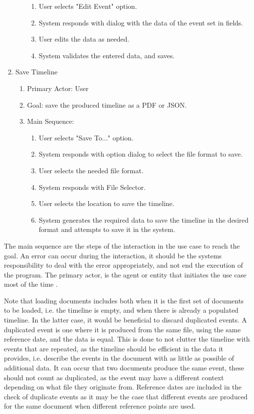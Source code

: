 \begin{enumerate}
\begin{enumerate}
\begin{enumerate}
		\item User selects "Edit Event" option.
		\item System responds with dialog with the data of the event set in fields.
		\item User edits the data as needed.
		\item System validates the entered data, and saves.
	\end{enumerate}
     \end{enumerate}
   \item Save Timeline
    \begin{enumerate}
	\item Primary Actor: User
	\item Goal: save the produced timeline as a PDF or JSON.
	\item Main Sequence:
	\begin{enumerate}
		\item User selects "Save To..." option.
		\item System responds with option dialog to select the file format to save.
		\item User selects the needed file format.
		\item System responds with File Selector.
		\item User selects the location to save the timeline.
		\item System generates the required data to save the timeline in the desired format and attempts to save it in the system.
	\end{enumerate}
    \end{enumerate}
\end{enumerate}

\par The main sequence are the steps of the interaction in the use case to reach the goal. An error can occur during the interaction, it should be the systems responsibility to deal with the error appropriately, and not end the execution of the program. The primary actor, is the agent or entity that initiates the use case most of the time \cite{oracleagent}.
\par Note that loading documents includes both when it is the first set of documents to be loaded, i.e. the timeline is empty, and when there is already a populated timeline. In the latter case, it would be beneficial to discard duplicated events. A duplicated event is one where it is produced from the same file, using the same reference date, and the data is equal. This is done to not clutter the timeline with events that are repeated, as the timeline should be efficient in the data it provides, i.e. describe the events in the document with as little as possible of additional data. It can occur that two documents produce the same event, these should not count as duplicated, as the event may have a different context depending on what file they originate from. Reference dates are included in the check of duplicate events as it may be the case that different events are produced for the same document when different reference points are used. 

